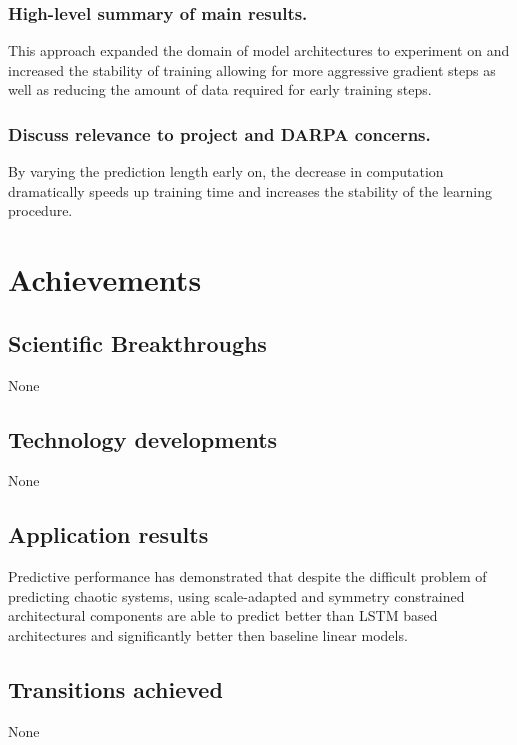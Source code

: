 \documentclass[12pt]{article}
\theoremstyle{plain}
\theoremstyle{remark}
\theoremstyle{definition}
\begin{document}
\subsubsection{High-level summary of main results.}
This approach expanded the domain of model architectures to experiment on and increased the stability of training allowing for more aggressive gradient steps as well as reducing the amount of data required for early training steps.

\subsubsection{Discuss relevance to project and DARPA concerns.}
By varying the prediction length early on, the decrease in computation dramatically speeds up training time and increases the stability of the learning procedure.
\section{Achievements}

\subsection{Scientific Breakthroughs}

None

\subsection{Technology developments}

None

\subsection{Application results}

Predictive performance has demonstrated that despite the difficult problem of predicting chaotic systems, using scale-adapted and symmetry constrained architectural components are able to predict better than LSTM based architectures and significantly better then baseline linear models.

\subsection{Transitions achieved}

None

\end{document}
